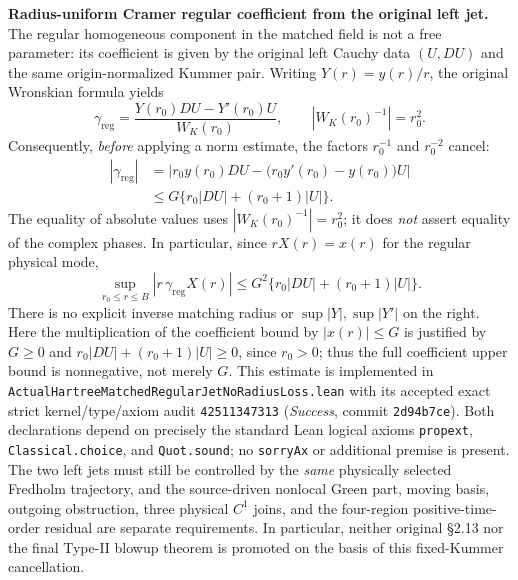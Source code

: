 \documentclass[11pt]{amsart}
\begin{document}
\medskip
\noindent\textbf{Radius-uniform Cramer regular coefficient from the original left jet.}
The regular homogeneous component in the matched field is not a free
parameter: its coefficient is given by the original left Cauchy data
$(U,DU)$ and the same origin-normalized Kummer pair.  Writing
$Y(r)=y(r)/r$, the original Wronskian formula yields
\[
 \gamma_{\mathrm{reg}}
  =\frac{Y(r_0)DU-Y'(r_0)U}{W_K(r_0)},\qquad
 |W_K(r_0)^{-1}|=r_0^2.
\]
Consequently, \emph{before} applying a norm estimate, the factors
$r_0^{-1}$ and $r_0^{-2}$ cancel:
\[
 \begin{aligned}
 |\gamma_{\mathrm{reg}}|
 &=\left|r_0y(r_0)DU-
    \bigl(r_0y'(r_0)-y(r_0)\bigr)U\right|\\
 &\le G\{r_0|DU|+(r_0+1)|U|\}.
 \end{aligned}
\]
The equality of absolute values uses
$|W_K(r_0)^{-1}|=r_0^2$; it does \emph{not} assert equality of
the complex phases.  In particular, since
$rX(r)=x(r)$ for the regular physical mode,
\[
 \boxed{\;
 \sup_{r_0\le r\le B}
  |r\,\gamma_{\mathrm{reg}}X(r)|
 \le G^2\{r_0|DU|+(r_0+1)|U|\}. \;}
\]
There is no explicit inverse matching radius or
$\sup|Y|,\sup|Y'|$ on the right.  Here the multiplication
of the coefficient bound by $|x(r)|\le G$ is justified by
$G\ge0$ and
$r_0|DU|+(r_0+1)|U|\ge0$, since $r_0>0$;
thus the full coefficient upper bound is nonnegative, not merely $G$.
This estimate is implemented in
\texttt{ActualHartreeMatchedRegularJetNoRadiusLoss.lean}
with its accepted exact strict kernel/type/axiom audit
\texttt{42511347313} (\emph{Success}, commit \texttt{2d94b7ce}).
Both declarations depend on precisely the standard Lean logical axioms
\texttt{propext}, \texttt{Classical.choice}, and \texttt{Quot.sound};
no \texttt{sorryAx} or additional premise is present.  The two left jets
must still be controlled by the \emph{same} physically selected Fredholm
trajectory, and the source-driven nonlocal Green part, moving basis,
outgoing obstruction, three physical $C^1$ joins, and the four-region
positive-time-order residual are separate requirements.  In particular,
neither original \S2.13 nor the final Type-II blowup theorem is promoted
on the basis of this fixed-Kummer cancellation.
\end{document}
